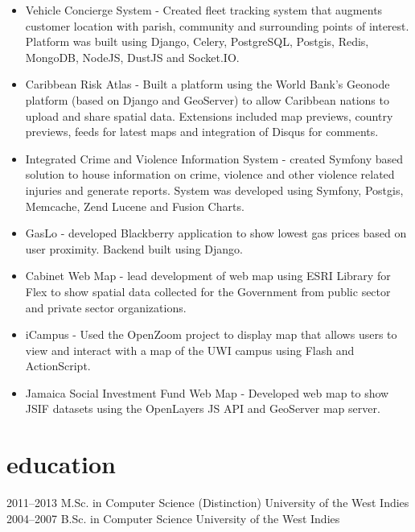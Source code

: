 \documentclass[]{cv-style}          %
\begin{document}
\begin{entrylist}
{\begin{itemize}
\item Vehicle Concierge System - Created fleet tracking system that augments customer location with parish, community and surrounding points of interest. Platform was built using Django, Celery, PostgreSQL, Postgis, Redis, MongoDB, NodeJS, DustJS and Socket.IO. 
\item Caribbean Risk Atlas - Built a platform using the World Bank's Geonode platform (based on Django and GeoServer) to allow Caribbean nations to upload and share spatial data. Extensions included map previews, country previews, feeds for latest maps and integration of Disqus for comments.
\item Integrated Crime and Violence Information System - created Symfony based solution to house information on crime, violence and other violence related injuries and generate reports. System was developed using Symfony, Postgis, Memcache, Zend Lucene and Fusion Charts.
\item GasLo - developed Blackberry  application  to  show  lowest  gas  prices  based  on  user proximity. Backend built using Django.
\item Cabinet Web Map - lead development of web map using ESRI Library for Flex to show spatial data collected for the Government from public sector and private sector organizations.
\item iCampus - Used the OpenZoom project to display map that allows users to view and interact with a map of the UWI campus using Flash and ActionScript.
\item Jamaica Social Investment Fund Web Map - Developed web map to show JSIF datasets using the OpenLayers JS API and GeoServer map server. 
\end{itemize}
}
\end{entrylist}


\section{education}

\begin{entrylist}
\entry
{2011--2013}
{M.Sc. {\normalfont in Computer Science (Distinction)}}
{University of the West Indies}
{\vspace{-0.3cm}}
\entry
{2004--2007}
{B.Sc. {\normalfont in Computer Science}}
{University of the West Indies}
{}
\end{entrylist}
\end{document}
